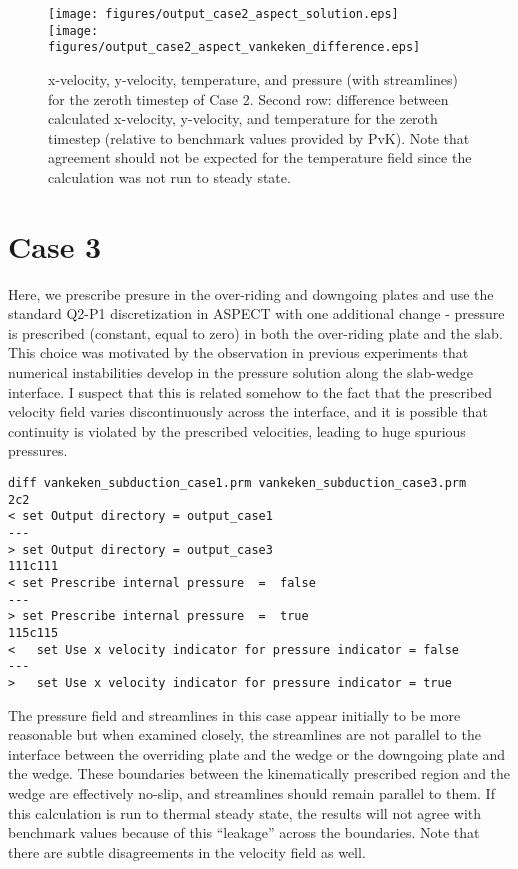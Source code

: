 \documentclass[11pt,letterpaper]{article}
\begin{document}
\begin{figure}[!htb]
\texttt{[image: figures/output\_case2\_aspect\_solution.eps]}\\
\texttt{[image: figures/output\_case2\_aspect\_vankeken\_difference.eps]}
\caption{x-velocity, y-velocity, temperature, and pressure (with streamlines) for the zeroth timestep of Case 2. Second row: difference between calculated x-velocity, y-velocity, and temperature for the zeroth timestep (relative to benchmark values provided by PvK). Note that agreement should not be expected for the temperature field since the calculation was not run to steady state.}
\end{figure}

\section{Case 3}
Here, we prescribe presure in the over-riding and downgoing plates and use the standard Q2-P1 discretization in ASPECT with one additional change - pressure is prescribed (constant, equal to zero) in both the over-riding plate and the slab. This choice was motivated by the observation in previous experiments that numerical instabilities develop in the pressure solution along the slab-wedge interface. I suspect that this is related somehow to the fact that the prescribed velocity field varies discontinuously across the interface, and it is possible that continuity is violated by the prescribed velocities, leading to huge spurious pressures. 
\begin{verbatim}
diff vankeken_subduction_case1.prm vankeken_subduction_case3.prm
2c2
< set Output directory = output_case1
---
> set Output directory = output_case3
111c111
< set Prescribe internal pressure  =  false
---
> set Prescribe internal pressure  =  true
115c115
<   set Use x velocity indicator for pressure indicator = false
---
>   set Use x velocity indicator for pressure indicator = true
\end{verbatim}

The pressure field and streamlines in this case appear initially to be more reasonable but when examined closely, the streamlines are not parallel to the interface between the overriding plate and the wedge or the downgoing plate and the wedge. These boundaries between the kinematically prescribed region and the wedge are effectively no-slip, and streamlines should remain parallel to them. If this calculation is run to thermal steady state, the results will not agree with benchmark values because of this ``leakage'' across the boundaries. Note that there are subtle disagreements in the velocity field as  well.
\end{document}
